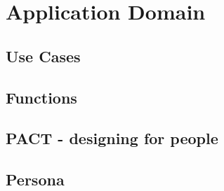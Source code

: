 \chapter{Application Domain}

\section{Use Cases}\label{usecase}


\section{Functions}


\section{PACT - designing for people}\label{pact}


\section{Persona}

